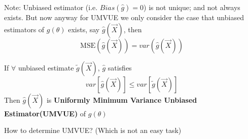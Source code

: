         Note:
    Unbiased estimator (i.e. $Bias(\hat{g})=0$) is not unique; and not always exists. But now anyway for UMVUE we only consider the case that unbiased estimators of $g(\theta)$ exists, say $\hat{g}(\vec{X})$, then
        \begin{equation} \mathrm{MSE}(\hat{g}(\vec{X}))=var(\hat{g}(\vec{X})) \end{equation}

    If $\forall$ unbiased estimate $\tilde{g}(\vec{X})$, $\hat{g}$ satisfies
        \begin{equation}
            var[\hat{g}(\vec{X})]\leq var[\tilde{g}(\vec{X})]    
        \end{equation}
        Then $\hat{g}(\vec{X})$ is \textbf{Uniformly Minimum Variance Unbiased Estimator(UMVUE)} of $g(\theta)$

\begin{point}
    How to determine UMVUE? (Which is not an easy task)
\end{point}

